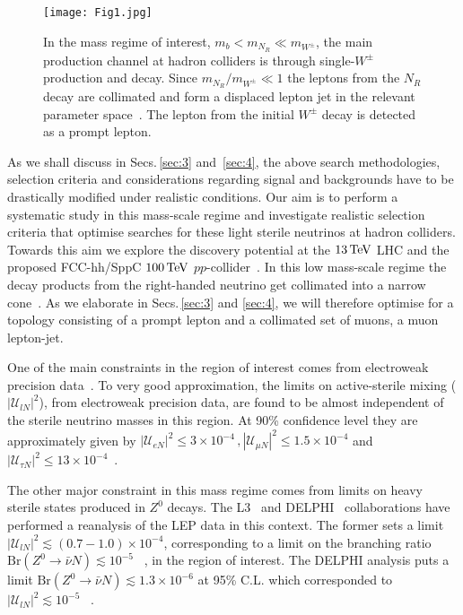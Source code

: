 \documentclass[reprint,doublecolumn,secnumarabic,amssymb, amsmath, aps,nofootinbib,superscriptaddress]{revtex4-1}
\begin{document}
\begin{figure}
  \centering
   \texttt{[image: Fig1.jpg]}
  \caption{In the mass regime of interest, $m_b < m_{N_R} \ll m_{W^\pm}$, the main production channel at hadron colliders is through single-$W^\pm$ production and decay. Since $m_{N_R}/m_{W^\pm} \ll 1$ the leptons from the $N_R$ decay are collimated and form a displaced lepton jet in the relevant parameter space~\cite{Izaguirre:2015pga}. The lepton from the initial $W^\pm$ decay is detected as a prompt lepton.}
  \label{fig:signal_event}
\end{figure}

As we shall discuss in Secs.\,\ref{sec:3} and \,\ref{sec:4}, the above search methodologies, selection criteria and considerations regarding signal and backgrounds have to be drastically modified under realistic conditions. Our aim is to perform a systematic study in this mass-scale regime and investigate realistic selection criteria that optimise searches for these light sterile neutrinos at hadron colliders. Towards this aim we explore the discovery potential at the $13\,\rm{TeV}$ LHC and the proposed FCC-hh/SppC $100\,\rm{TeV}$ $pp$-collider~\cite{Golling:2016gvc,CEPC-SPPCStudyGroup:2015csa}. In this low mass-scale regime the decay products from the right-handed neutrino get collimated into a narrow cone~\cite{Izaguirre:2015pga}. As we elaborate in Secs.\,\ref{sec:3} and \ref{sec:4}, we will therefore optimise for a topology consisting of a prompt lepton and a collimated set of muons, a muon lepton-jet. 

One of the main constraints in the region of interest comes from electroweak precision data~\cite{delAguila:2008pw, Akhmedov:2013hec, Basso:2013jka, Blas:2013ana, Antusch:2015mia}. To very good approximation, the limits on active-sterile mixing ($|\mathcal{U}_{lN}|^2$), from electroweak precision data, are found to be almost independent of the sterile neutrino masses in this region. At 90\% confidence level they are approximately given by $|\mathcal{U}_{e N}|^2 \leq 3\times 10^{-4}\, , |\mathcal{U}_{\mu N}|^2 \leq 1.5\times10^{-4}$ and  $|\mathcal{U}_{\tau N}|^2 \leq 13\times10^{-4}$~\cite{Deppisch:2015qwa, delAguila:2008pw, Akhmedov:2013hec, Basso:2013jka, Blas:2013ana, Antusch:2015mia}.

The other major constraint in this mass regime comes from limits on heavy sterile states produced in $Z^0$ decays. The L3~\cite{Adriani:1992pq} and DELPHI~\cite{Abreu:1996pa} collaborations have performed a reanalysis of the LEP data in this context. The former sets a limit $|\mathcal{U}_{lN}|^2\lesssim (0.7-1.0)\times 10^{-4}$, corresponding to a limit on the branching ratio $\text{Br}(Z^0\rightarrow \bar{\nu} N)\lesssim 10^{-5}$ ~\cite{Shevchenko:1993fe}, in the region of interest. The DELPHI analysis puts a limit $\text{Br}(Z^0\rightarrow \bar{\nu} N)\lesssim 1.3\times10^{-6}$ at 95\% C.L. which corresponded to $|\mathcal{U}_{lN}|^2\lesssim 10^{-5}$ ~\cite{Abreu:1996pa}.
\end{document}

